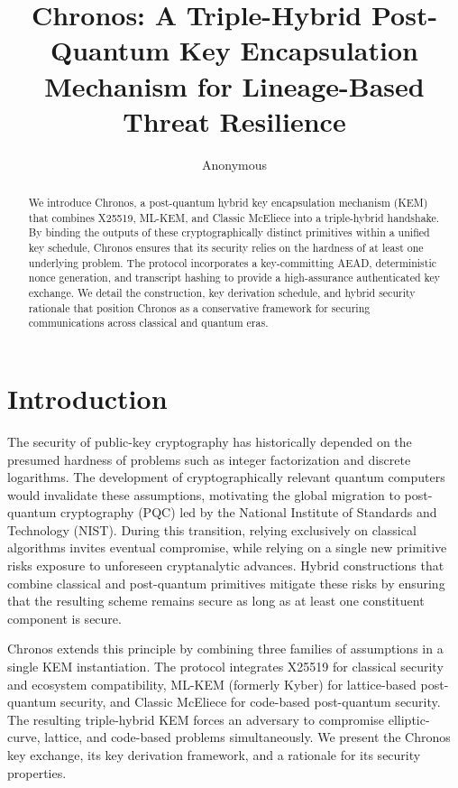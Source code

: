 \documentclass[runningheads]{llncs}
\begin{document}
\title{Chronos: A Triple-Hybrid Post-Quantum Key Encapsulation Mechanism for Lineage-Based Threat Resilience}

\author{Anonymous}
\institute{}

\maketitle

\begin{abstract}
We introduce Chronos, a post-quantum hybrid key encapsulation mechanism (KEM) that combines X25519, ML-KEM, and Classic McEliece into a triple-hybrid handshake. By binding the outputs of these cryptographically distinct primitives within a unified key schedule, Chronos ensures that its security relies on the hardness of at least one underlying problem. The protocol incorporates a key-committing AEAD, deterministic nonce generation, and transcript hashing to provide a high-assurance authenticated key exchange. We detail the construction, key derivation schedule, and hybrid security rationale that position Chronos as a conservative framework for securing communications across classical and quantum eras.
\end{abstract}

\section{Introduction}
The security of public-key cryptography has historically depended on the presumed hardness of problems such as integer factorization and discrete logarithms. The development of cryptographically relevant quantum computers would invalidate these assumptions, motivating the global migration to post-quantum cryptography (PQC) led by the National Institute of Standards and Technology (NIST). During this transition, relying exclusively on classical algorithms invites eventual compromise, while relying on a single new primitive risks exposure to unforeseen cryptanalytic advances. Hybrid constructions that combine classical and post-quantum primitives mitigate these risks by ensuring that the resulting scheme remains secure as long as at least one constituent component is secure.

Chronos extends this principle by combining three families of assumptions in a single KEM instantiation. The protocol integrates X25519 for classical security and ecosystem compatibility, ML-KEM (formerly Kyber) for lattice-based post-quantum security, and Classic McEliece for code-based post-quantum security. The resulting triple-hybrid KEM forces an adversary to compromise elliptic-curve, lattice, and code-based problems simultaneously. We present the Chronos key exchange, its key derivation framework, and a rationale for its security properties.
\end{document}
